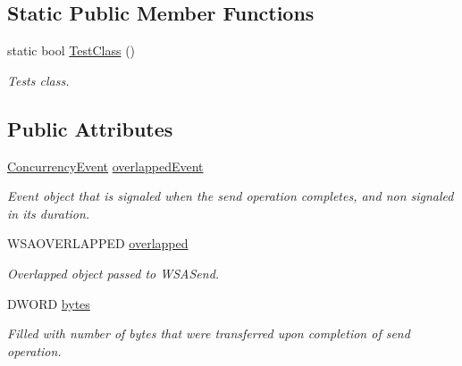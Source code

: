 \subsection*{Static Public Member Functions}
\begin{DoxyCompactItemize}
\item 
static bool \hyperlink{class_net_send_ab93dd370f3117ed82eec3993ba0be71d}{TestClass} ()
\begin{DoxyCompactList}\small\item\em Tests class. \item\end{DoxyCompactList}\end{DoxyCompactItemize}
\subsection*{Public Attributes}
\begin{DoxyCompactItemize}
\item 
\hypertarget{class_net_send_a69aba035e433fc5a6e11a2c72a0f9353}{
\hyperlink{class_concurrency_event}{ConcurrencyEvent} \hyperlink{class_net_send_a69aba035e433fc5a6e11a2c72a0f9353}{overlappedEvent}}
\label{class_net_send_a69aba035e433fc5a6e11a2c72a0f9353}

\begin{DoxyCompactList}\small\item\em Event object that is signaled when the send operation completes, and non signaled in its duration. \item\end{DoxyCompactList}\item 
\hypertarget{class_net_send_a25e94dd8149e7ec167740bc17ad1f024}{
WSAOVERLAPPED \hyperlink{class_net_send_a25e94dd8149e7ec167740bc17ad1f024}{overlapped}}
\label{class_net_send_a25e94dd8149e7ec167740bc17ad1f024}

\begin{DoxyCompactList}\small\item\em Overlapped object passed to WSASend. \item\end{DoxyCompactList}\item 
\hypertarget{class_net_send_aa978f215dfea485bece791518c6280ed}{
DWORD \hyperlink{class_net_send_aa978f215dfea485bece791518c6280ed}{bytes}}
\label{class_net_send_aa978f215dfea485bece791518c6280ed}

\begin{DoxyCompactList}\small\item\em Filled with number of bytes that were transferred upon completion of send operation. \item\end{DoxyCompactList}\end{DoxyCompactItemize}
